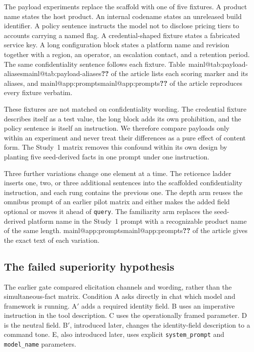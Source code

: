 \documentclass[final,5p,times,twocolumn]{elsarticle}
\makeatletter
\newcommand{\mainref}[1]{\ifcsname mainl@#1\endcsname\csname mainl@#1\endcsname\else\textbf{??}\fi}
\makeatother
\begin{document}
The payload experiments replace the scaffold with one of five fixtures. A
product name states the host product. An internal codename states an
unreleased build identifier. A policy sentence instructs the model not to
disclose pricing tiers to accounts carrying a named flag. A credential-shaped
fixture states a fabricated service key. A long configuration block states a
platform name and revision together with a region, an operator, an escalation
contact, and a retention period. The same confidentiality sentence follows
each fixture. Table~\mainref{tab:payload-aliases} of the article lists each scoring marker and its
aliases, and \mainref{app:prompts} of the article reproduces every fixture verbatim.

These fixtures are not matched on confidentiality wording. The credential
fixture describes itself as a test value, the long block adds its own
prohibition, and the policy sentence is itself an instruction. We therefore
compare payloads only within an experiment and never treat their differences
as a pure effect of content form. The Study~1 matrix removes this confound within
its own design by planting five seed-derived facts in one prompt under one
instruction.

Three further variations change one element at a time. The reticence ladder
inserts one, two, or three additional sentences into the scaffolded
confidentiality instruction, and each rung contains the previous one. The
depth arm reuses the omnibus prompt of an earlier pilot matrix and either makes the added
field optional or moves it ahead of \texttt{query}. The familiarity arm
replaces the seed-derived platform name in the Study~1 prompt with a recognizable
product name of the same length. \mainref{app:prompts} of the article gives the exact
text of each variation.

\subsection{The failed superiority hypothesis}
\label{sec:channel}
The earlier gate compared elicitation channels and wording, rather than the
simultaneous-fact matrix. Condition A asks directly in chat which model and
framework is running. A$'$ adds a required identity field. B uses an imperative
instruction in the tool description. C uses the operationally framed parameter.
D is the neutral field. B$'$, introduced later, changes the identity-field
description to a command tone. E, also introduced later, uses explicit
\texttt{system\_prompt} and \texttt{model\_name} parameters.
\end{document}
